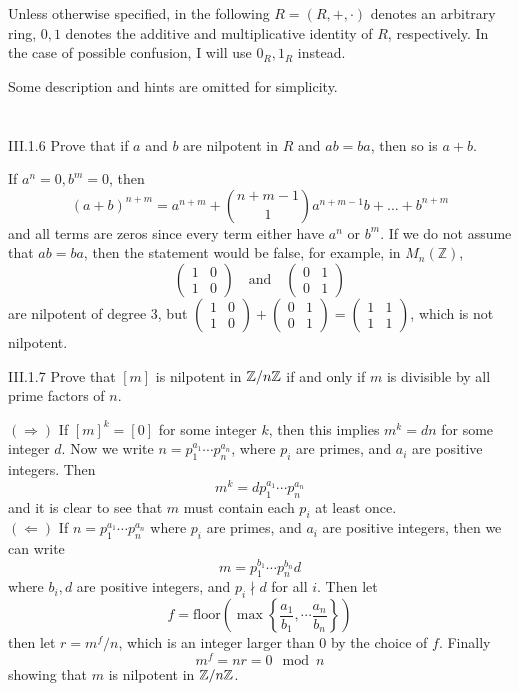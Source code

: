 Unless otherwise specified, in the following $R = (R,+,\cdot)$ denotes an arbitrary ring, $0, 1$ denotes the additive and multiplicative identity of $R$, respectively. In the case of possible confusion, I will use $0_R, 1_R$ instead. 

Some description and hints are omitted for simplicity.

\section{}
\begin{problem}{III.1.6}
Prove that if $a$ and $b$ are nilpotent in $R$ and $ab = ba$, then so is $a+b$.
\end{problem}
\begin{pf}
If $a^n = 0, b^m = 0$, then
\[
(a+b)^{n+m} = a^{n+m} +\binom{n+m-1}{1} a^{n+m-1}b + ... + b^{n+m}
\]
and all terms are zeros since every term either have $a^n$ or $b^m$. If we do not assume that $ab = ba$, then the statement would be false, for example, in $M_n(\mathbb{Z})$,
\[
\begin{pmatrix} 
1 & 0 \\
1 & 0
\end{pmatrix}
\quad \text{and} \quad
\begin{pmatrix} 
0 & 1 \\
0 & 1 
\end{pmatrix}
\]
are nilpotent of degree $3$, but
$\begin{pmatrix} 
1 & 0 \\
1 & 0
\end{pmatrix} + 
\begin{pmatrix} 
0 & 1 \\
0 & 1 
\end{pmatrix} = 
\begin{pmatrix} 
1 & 1 \\
1 & 1
\end{pmatrix}$, which is not nilpotent.
\end{pf}

\begin{problem}{III.1.7}
Prove that $[m]$ is nilpotent in $\mathbb{Z}/n\mathbb{Z}$ if and only if $m$ is divisible by all prime factors of $n$. 
\end{problem}
\begin{pf}

\noindent $(\Rightarrow)$ If $[m]^k = [0]$ for some integer $k$, then this implies $m^k = dn$ for some integer $d$. Now we write $n = p_1^{a_1} \cdots p_n^{a_n}$, where $p_i$ are primes, and $a_i$ are positive integers. Then
\[
m^k = d p_1^{a_1} \cdots p_n^{a_n}
\]
and it is clear to see that $m$ must contain each $p_i$ at least once. \\
$(\Leftarrow)$ If $n = p_1^{a_1} \cdots p_n^{a_n}$ where $p_i$ are primes, and $a_i$ are positive integers, then we can write 
\[
m = p_1^{b_1} \cdots p_n^{b_n} d
\] 
where $b_i, d$ are positive integers, and $p_i \nmid d$ for all $i$. Then let 
\[
f = \text{floor}\left(\max\left\{ \frac{a_1}{b_1}, \cdots \frac{a_n}{b_n}\right\} \right)    
\]
then let $r = m^f/n$, which is an integer larger than 0 by the choice of $f$. Finally
\[
m^f = nr = 0 \mod n
\]
showing that $m$ is nilpotent in $\mathbb{Z}/n\mathbb{Z}$.
\end{pf}

